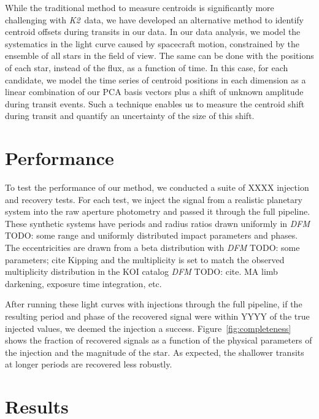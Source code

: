 \documentclass[12pt,preprint]{aastex}
\newcommand{\project}[1]{\textsl{#1}} %
\newcommand{\kepler}{\project{Kepler}}
\newcommand{\KT}{\project{K2}}
\newcommand{\figref}[1]{\ref{fig:#1}}
\newcommand{\Fig}[1]{Figure~\figref{#1}}
\newcommand{\todo}[3]{{\color{#2} \emph{#1} TODO: #3}}
\newcommand{\dfmtodo}[1]{\todo{DFM}{red}{#1}}
\begin{document}
While the traditional method to measure centroids is significantly more
challenging with \KT\ data, we have developed an alternative method
to identify centroid offsets during transits in our data.
In our data analysis, we model the systematics in the light curve
caused by spacecraft motion, constrained by the ensemble of all stars in
the field of view.
The same can be done with the positions of each star, instead of the flux,
as a function of time.
In this case, for each candidate, we model the time series of centroid
positions in each dimension as a linear combination of our PCA basis vectors
plus a shift of unknown amplitude during transit events.
Such a technique enables us to measure the centroid shift during transit and
quantify an uncertainty of the size of this shift.




\section{Performance}

To test the performance of our method, we conducted a suite of XXXX injection
and recovery tests.
For each test, we inject the signal from a realistic planetary system into the
raw aperture photometry and passed it through the full pipeline.
These synthetic systems have periods and radius ratios drawn uniformly in
\dfmtodo{some range} and uniformly distributed impact parameters and phases.
The eccentricities are drawn from a beta distribution with \dfmtodo{some
parameters; cite Kipping} and the multiplicity is set to match the observed
multiplicity distribution in the KOI catalog \dfmtodo{cite}.
MA limb darkening, exposure time integration, etc.

After running these light curves with injections through the full pipeline, if
the resulting period and phase of the recovered signal were within YYYY of the
true injected values, we deemed the injection a success.
\Fig{completeness} shows the fraction of recovered signals as a function of the
physical parameters of the injection and the magnitude of the star.
As expected, the shallower transits at longer periods are recovered less
robustly.



\section{Results}
\end{document}
